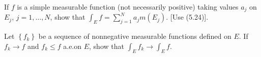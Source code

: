 \begin{problem}
  If $f$ is a simple measurable function (not necessarily positive) taking
  values $a_j$ on $E_j$, $j=1,\ldots,N$, show that
  $\int_E f=\sum_{j=1}^N a_jm(E_j)$. [Use (5.24)].
\end{problem}
\begin{solution}
\end{solution}

\begin{problem}
  Let $\left\{f_k\right\}$ be a sequence of nonnegative measurable
  functions defined on $E$. If $f_k\to f$ and $f_k\leq f$ a.e.\@ on $E$,
  show that $\int_E f_k\to\int_E f$.
\end{problem}
\begin{solution}
\end{solution}


